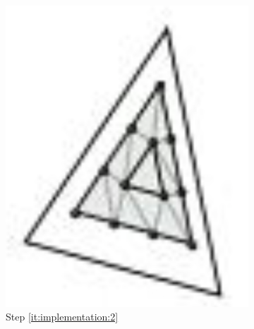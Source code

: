 \begin{figure}
\begin{subfigure}[b]{0.18\columnwidth}
		\includegraphics[width=\textwidth]{content/img/implementation/tessellation_2.png}
		\caption{Step \ref{it:implementation:2}}
		\label{fig:implementation:step:2}
	\end{subfigure}		
	\begin{subfigure}[b]{0.18\columnwidth}
		\centering

\end{subfigure}
\end{figure}

